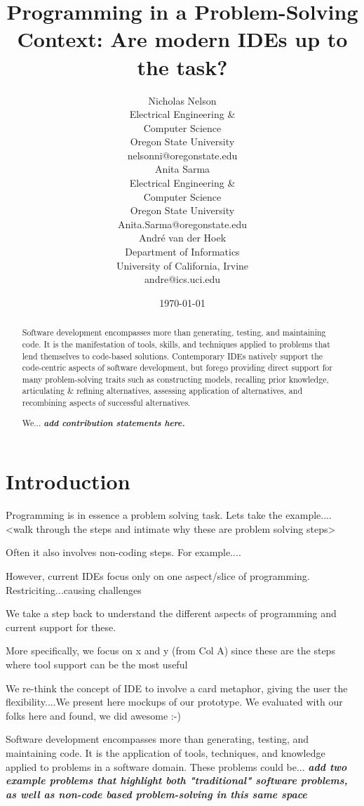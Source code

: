\documentclass{ppig}
\title{Programming in a Problem-Solving Context: Are modern IDEs up to the task?}
\author{Nicholas Nelson \\
  Electrical Engineering \&\\ Computer Science \\
  Oregon State University \\
  nelsonni@oregonstate.edu \\
  \And
  Anita Sarma \\
  Electrical Engineering \&\\ Computer Science \\
  Oregon State University \\
  Anita.Sarma@oregonstate.edu \\
  \And
  André van der Hoek \\
  Department of Informatics \\
  University of California, Irvine \\
  andre@ics.uci.edu}
\date{\today}
\newcommand{\bold}[1]{\textit{\textbf{\color{red}#1}}}
\begin{document}
\maketitle
\thispagestyle{empty}

\begin{abstract}
Software development encompasses more than generating, testing, and maintaining code.
It is the manifestation of tools, skills, and techniques applied to problems that lend themselves to code-based solutions.
Contemporary IDEs natively support the code-centric aspects of software development, but forego providing direct support for many problem-solving traits such as constructing models, recalling prior knowledge, articulating \& refining alternatives, assessing application of alternatives, and recombining aspects of successful alternatives.

We... \bold{add contribution statements here.}
\end{abstract}

\section{Introduction}

Programming is in essence a problem solving task. Lets take the example.... <walk through the steps and intimate why these are problem solving steps>

Often it also involves non-coding steps. For example....

However, current IDEs focus only on one aspect/slice of programming. Restriciting...causing challenges 

We take a step back to understand the different aspects of programming and current support for these.

More specifically, we focus on x and y (from Col A) since these are the steps where tool support can be the most useful

We re-think the concept of IDE to involve a card metaphor, giving the user the flexibility....We present here mockups of our prototype.
We evaluated with our folks here and found, we did awesome :-)
 





Software development encompasses more than generating, testing, and maintaining code.
It is the application of tools, techniques, and knowledge applied to problems in a software domain.
These problems could be... \bold{add two example problems that highlight both "traditional" software problems, as well as non-code based problem-solving in this same space}
\end{document}
